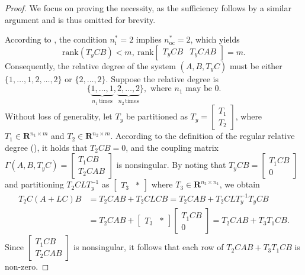 \documentclass[10pt,a4paper]{amsart}
\newcommand\GAmma{\mathit\Gamma}
\newcommand\nsharp{n_\mathrm i^*}
\newcommand\nocstar{n_\mathrm{oc}^*}
\newcommand\rank{\mathrm{rank}}
\newcommand\R{\mathbf R}
\begin{document}
\setcounter{section}{3}
\setcounter{equation}{3}
\setcounter{corollary}{0}
\setcounter{definition}{4}
\setcounter{lemma}{7}
\setcounter{problem}{1}
\setcounter{prop}{3}
\setcounter{remark}{4}
\setcounter{theorem}{1}
\begin{proof}
We focus on proving the necessity, as the sufficiency follows by a similar argument and is thus omitted for brevity.

According to , the condition $\nsharp=2$ implies $\nocstar=2$, which yields
\[
\rank(T_yCB)<m, \ \rank\begin{bmatrix}T_yCB & T_yCAB\end{bmatrix}=m.
\]
Consequently, the relative degree of the system $(A,B,T_yC)$ must be either $\{1,\dots,1,2,\dots,2\}$ or $\{2,\dots,2\}$.
Suppose the relative degree is
\[
\{\underbrace{1,\dots,1}_{n_1\,\mathrm{times}}, \underbrace{2,\dots,2}_{n_2\,\mathrm{times}}\},
\text{ where $n_1$ may be $0$.}
\]
Without loss of generality, let $T_y$ be partitioned as $T_y=\begin{bmatrix}T_1\\ T_2\end{bmatrix}$, where $T_1\in\R^{n_1\times m}$ and $T_2\in\R^{n_2\times m}$.
According to the definition of the regular relative degree (), it holds that $T_2CB=0$, and the coupling matrix
$\GAmma(A,B,T_yC)=\begin{bmatrix}T_1CB\\ T_2CAB\end{bmatrix}$
is nonsingular. By noting that $T_yCB = \begin{bmatrix}T_1CB \\ 0\end{bmatrix}$ and partitioning $T_2CLT_y^{-1}$ as $\begin{bmatrix}T_3 & *\end{bmatrix}$ where $T_3\in\R^{n_2\times n_1}$, we obtain
\begin{align*}
T_2C(A+LC)B
&= T_2CAB + T_2CLCB
= T_2CAB + T_2CLT_y^{-1}T_yCB \\
&= T_2CAB + \begin{bmatrix}T_3 & *\end{bmatrix} \begin{bmatrix}T_1CB \\ 0\end{bmatrix}
= T_2CAB + T_3T_1CB.
\end{align*}
Since $\begin{bmatrix}T_1CB \\ T_2CAB\end{bmatrix}$ is nonsingular, it follows that each row of $T_2CAB + T_3T_1CB$ is non-zero.

\end{proof}
\end{document}
